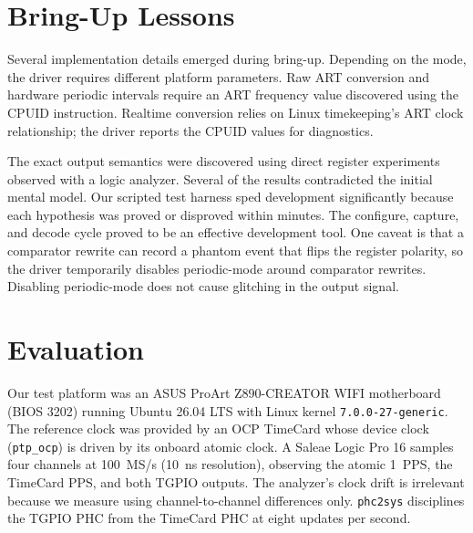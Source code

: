 \documentclass[conference,a4paper]{IEEEtran}
\newcommand{\phcsys}{\texttt{phc2sys}\xspace}
\begin{document}
\section{Bring-Up Lessons}\label{sec:bring-up-lessons}

Several implementation details emerged during bring-up. Depending on the mode, the driver requires different platform parameters. Raw ART conversion and hardware periodic intervals require an ART frequency value discovered using the CPUID instruction. Realtime conversion relies on Linux timekeeping's ART clock relationship; the driver reports the CPUID values for diagnostics.

The exact output semantics were discovered using direct register experiments observed with a logic analyzer. Several of the results contradicted the initial mental model. Our scripted test harness sped development significantly because each hypothesis was proved or disproved within minutes. The configure, capture, and decode cycle proved to be an effective development tool. One caveat is that a comparator rewrite can record a phantom event that flips the register polarity, so the driver temporarily disables periodic-mode around comparator rewrites. Disabling periodic-mode does not cause glitching in the output signal.

\section{Evaluation}\label{sec:evaluation}

Our test platform was an ASUS ProArt Z890-CREATOR WIFI motherboard (BIOS 3202) running Ubuntu 26.04 LTS with Linux kernel \texttt{7.0.0-27-generic}. The reference clock was provided by an OCP TimeCard whose device clock (\texttt{ptp\_ocp}) is driven by its onboard atomic clock. A Saleae Logic Pro 16 samples four channels at 100~MS/s (10~ns resolution), observing the atomic 1~PPS, the TimeCard PPS, and both TGPIO outputs. The analyzer's clock drift is irrelevant because we measure using channel-to-channel differences only. \phcsys disciplines the TGPIO PHC from the TimeCard PHC at eight updates per second.
\end{document}
